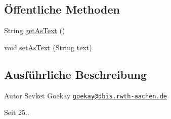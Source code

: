 \subsection*{Öffentliche Methoden}
\begin{DoxyCompactItemize}
\item 
String \hyperlink{classde_1_1rwth_1_1idsg_1_1steve_1_1web_1_1_local_date_editor_a93ce6a786d7d0c1429e19104cdaa0085}{get\+As\+Text} ()
\item 
void \hyperlink{classde_1_1rwth_1_1idsg_1_1steve_1_1web_1_1_local_date_editor_a4b7566f0410fd4744366121591580112}{set\+As\+Text} (String text)
\end{DoxyCompactItemize}


\subsection{Ausführliche Beschreibung}
\begin{DoxyAuthor}{Autor}
Sevket Goekay \href{mailto:goekay@dbis.rwth-aachen.de}{\tt goekay@dbis.\+rwth-\/aachen.\+de} 
\end{DoxyAuthor}
\begin{DoxySince}{Seit}
25.. 
\end{DoxySince}


